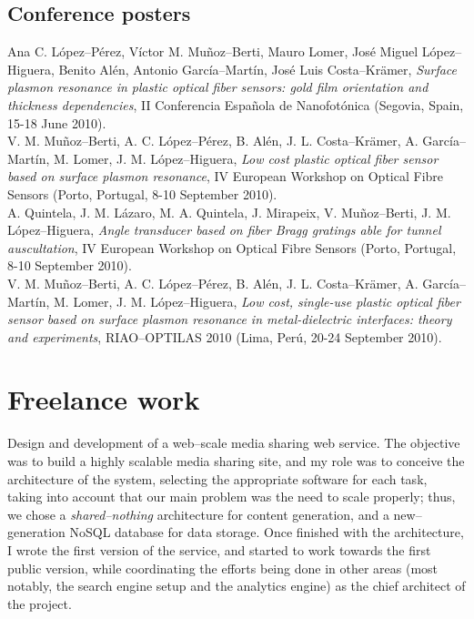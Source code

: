 \documentclass[11pt, a4paper]{article}
\newcommand{\years}[1]{\marginnote{\scriptsize #1}}
\begin{document}
\subsection*{Conference posters}
\noindent
\years{2010}Ana C. López--Pérez, Víctor M. Muñoz--Berti, Mauro Lomer, José Miguel López--Higuera, Benito Alén, Antonio García--Martín, José Luis Costa--Krämer, \textit{Surface plasmon resonance in plastic optical fiber sensors: gold film orientation and thickness dependencies}, II Conferencia Española de Nanofotónica (Segovia, Spain, 15-18 June 2010).\\
\years{2010}V. M. Muñoz--Berti, A. C. López--Pérez, B. Alén, J. L. Costa--Krämer, A. García--Martín, M. Lomer, J. M. López--Higuera, \textit{Low cost plastic optical fiber sensor based on surface plasmon resonance}, IV European Workshop on Optical Fibre Sensors (Porto, Portugal, 8-10 September 2010).\\
\years{2010}A. Quintela, J. M. Lázaro, M. A. Quintela, J. Mirapeix, V. Muñoz--Berti, J. M. López--Hi\-gue\-ra, \textit{Angle transducer based on fiber Bragg gratings able for tunnel auscultation}, IV European Workshop on Optical Fibre Sensors (Porto, Portugal, 8-10 September 2010).\\
\years{2010}V. M. Muñoz--Berti, A. C. López--Pérez, B. Alén, J. L. Costa--Krämer, A. García--Martín, M. Lomer, J. M. López--Higuera, \textit{Low cost, single-use plastic optical fiber sensor based on surface plasmon resonance in metal-dielectric interfaces: theory and experiments}, RIAO--OPTILAS 2010 (Lima, Perú, 20-24 September 2010).


\section*{Freelance work} %
\years{2010--present} Design and development of a web--scale media sharing web service. The objective was to build a highly scalable media sharing site, and my role was to conceive the architecture of the system, selecting the appropriate software for each task, taking into account that our main problem was the need to scale properly; thus, we chose a \textit{shared--nothing} architecture for content generation, and a new--generation NoSQL database for data storage. Once finished with the architecture, I wrote the first version of the service, and started to work towards the first public version, while coordinating the efforts being done in other areas (most notably, the search engine setup and the analytics engine) as the chief architect of the project.
\end{document}
